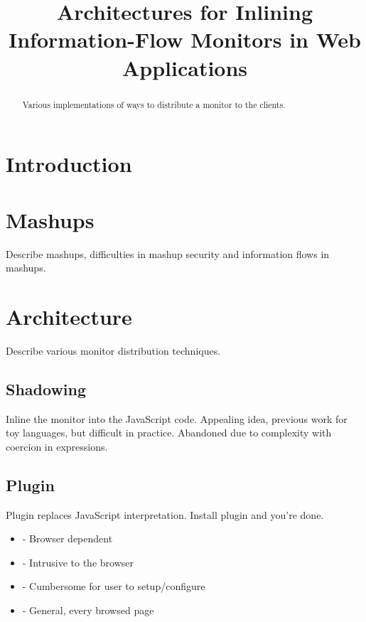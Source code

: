 \documentclass{llncs}
\title{Architectures for Inlining Information-Flow Monitors in Web Applications}
\begin{document}
\maketitle



\begin{abstract}
Various implementations of ways to distribute a monitor to the clients.
\end{abstract}










\section{Introduction}
\label{sec:intro}

\section{Mashups}
\label{sec:mash}

Describe mashups, difficulties in mashup security and information flows in mashups.

\section{Architecture}
\label{sec:arch}

Describe various monitor distribution techniques.


\subsection{Shadowing}

Inline the monitor into the JavaScript code. Appealing idea, previous work for 
toy languages, but difficult in practice. Abandoned due to complexity with 
coercion in expressions.

\subsection{Plugin}

Plugin replaces JavaScript interpretation. Install plugin and you're done.
\begin{itemize}
\item- Browser dependent
\item- Intrusive to the browser
\item- Cumbersome for user to setup/configure
\item- General, every browsed page
\end{itemize}
\end{document}
